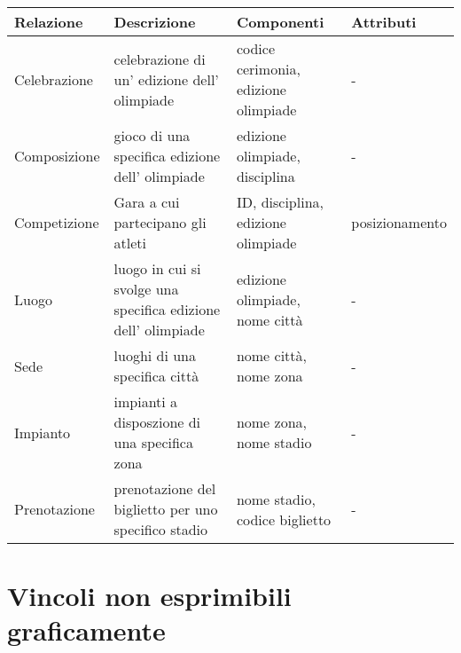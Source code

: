 \documentclass[paper=a4, fontsize=12 pt]{scrartcl} %
\begin{document}
	\begin{table}[H]
		\begin{tabular}{ ||p{3.6cm}|p{3.6cm}|p{3.6cm}|p{3.6cm}||  }
			\hline
			\hline
			\textbf{Relazione} & \textbf{Descrizione} & \textbf{Componenti} & \textbf{Attributi}\\
			
			\hline
			\hline
			
			Celebrazione & celebrazione di un' edizione dell' olimpiade & codice cerimonia, edizione olimpiade & \hspace{1.5cm}- \\
			\hline
			Composizione & gioco di una specifica edizione dell' olimpiade & edizione olimpiade, disciplina & \hspace{1.5cm} - \\
			\hline
			Competizione & Gara a cui partecipano gli atleti & ID, disciplina, edizione olimpiade & \hspace{3cm} posizionamento \\
			\hline
			Luogo & luogo in cui si svolge una specifica edizione dell' olimpiade & edizione olimpiade, nome città & \hspace{1.5cm} - \\
			\hline
			Sede & luoghi di una specifica città  & nome città, nome zona & \hspace{1.5cm} - \\
			\hline
			Impianto & impianti a disposzione di una specifica zona & nome zona, nome stadio & \hspace{1.5cm} - \\
			\hline
			Prenotazione & prenotazione del biglietto per uno specifico stadio  & nome stadio, codice biglietto & \hspace{1.5cm} - \\
			\hline
			\hline
		\end{tabular}
	\end{table}
	
	
	\newpage
	
	
	\section{Vincoli non esprimibili graficamente}
	
\end{document}
